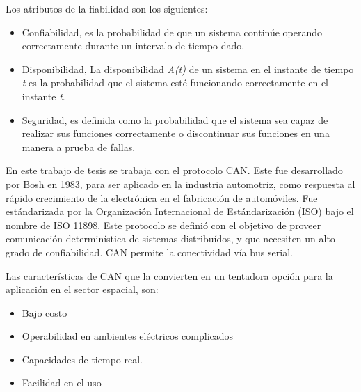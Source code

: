 Los atributos de la fiabilidad son los siguientes:
\begin{itemize}
\item Confiabilidad, es la probabilidad de que un sistema continúe operando correctamente
durante un intervalo de tiempo dado.
\item Disponibilidad, La disponibilidad \textit{A(t)} de un sistema en el
instante de tiempo \textit{t} es la probabilidad que el sistema esté funcionando correctamente en
el instante \textit{t}.
\item Seguridad, es definida como la probabilidad que el sistema sea capaz de realizar sus funciones correctamente o discontinuar sus funciones en una manera a prueba de fallas.
\end{itemize}

En este trabajo de tesis se trabaja con el protocolo CAN. Este fue desarrollado por Bosh en 1983, para ser aplicado en la industria automotriz, como respuesta al rápido crecimiento de la electrónica en el fabricación de automóviles. Fue estándarizada por la Organización Internacional de Estándarización (ISO) bajo el nombre de  ISO 11898. Este protocolo se definió con el objetivo de proveer comunicación determinística de sistemas distribuídos, y que necesiten un alto grado de confiabilidad. CAN permite la conectividad vía bus serial.

Las características de CAN que la convierten en un tentadora opción para la aplicación en el sector espacial, son:
\begin{itemize}
  \item Bajo costo
  \item Operabilidad en ambientes eléctricos complicados
  \item Capacidades de tiempo real.
  \item Facilidad en el uso
\end{itemize}
